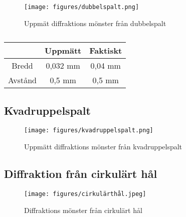 \documentclass[a4paper]{article}
\begin{document}
\begin{figure}[H]
    \begin{small}
        \begin{center}
            \texttt{[image: figures/dubbelspalt.png]}
        \end{center}
        \caption{Uppmät diffraktions mönster från dubbelspalt}
        \label{fig:dubbelspalt}
    \end{small}
\end{figure}

\begin{table}
    \caption{}
    \label{tab:}
    \centering
    \begin{tabular}{c|cc}
           & Uppmätt & Faktiskt \\
        \hline
        Bredd & 0,032 mm & 0,04 mm \\
        Avstånd & 0,5 mm & 0,5 mm \\
    \end{tabular}
\end{table}


\subsection{Kvadruppelspalt}

\begin{figure}[H]
    \begin{small}
        \begin{center}
            \texttt{[image: figures/kvadruppelspalt.png]}
        \end{center}
        \caption{Uppmätt diffraktions mönster från kvadruppelspalt}
        \label{fig:kvadruppelspalt}
    \end{small}
\end{figure}


\subsection{Diffraktion från cirkulärt hål}

\begin{figure}[H]
    \begin{small}
        \begin{center}
            \texttt{[image: figures/cirkulärthål.jpeg]}
        \end{center}
        \caption{Diffraktions mönster från cirkulärt hål}
        \label{fig:hål}
    \end{small}
\end{figure}
\end{document}
